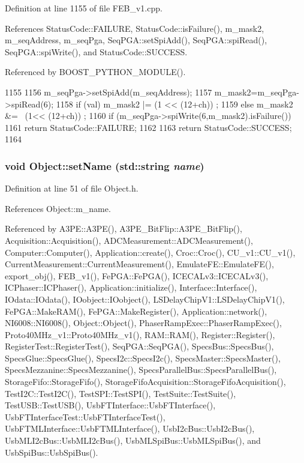 Definition at line 1155 of file FEB\_\-v1.cpp.

References StatusCode::FAILURE, StatusCode::isFailure(), m\_\-mask2, m\_\-seqAddress, m\_\-seqPga, SeqPGA::setSpiAdd(), SeqPGA::spiRead(), SeqPGA::spiWrite(), and StatusCode::SUCCESS.

Referenced by BOOST\_\-PYTHON\_\-MODULE().


\begin{DoxyCode}
1155                                                  {
1156   m_seqPga->setSpiAdd(m_seqAddress);
1157   m_mask2=m_seqPga->spiRead(6);
1158   if (val)  m_mask2 |= (1 << (12+ch))  ;
1159   else      m_mask2 &= ~(1<< (12+ch)) ;
1160   if (m_seqPga->spiWrite(6,m_mask2).isFailure()){
1161     return StatusCode::FAILURE;
1162   }
1163   return StatusCode::SUCCESS;  
1164 }
\end{DoxyCode}
\hypertarget{classObject_ae30fea75683c2d149b6b6d17c09ecd0c}{
\subsubsection[{setName}]{\setlength{\rightskip}{0pt plus 5cm}void Object::setName (std::string {\em name})}}
\label{classObject_ae30fea75683c2d149b6b6d17c09ecd0c}


Definition at line 51 of file Object.h.

References Object::m\_\-name.

Referenced by A3PE::A3PE(), A3PE\_\-BitFlip::A3PE\_\-BitFlip(), Acquisition::Acquisition(), ADCMeasurement::ADCMeasurement(), Computer::Computer(), Application::create(), Croc::Croc(), CU\_\-v1::CU\_\-v1(), CurrentMeasurement::CurrentMeasurement(), EmulateFE::EmulateFE(), export\_\-obj(), FEB\_\-v1(), FePGA::FePGA(), ICECALv3::ICECALv3(), ICPhaser::ICPhaser(), Application::initialize(), Interface::Interface(), IOdata::IOdata(), IOobject::IOobject(), LSDelayChipV1::LSDelayChipV1(), FePGA::MakeRAM(), FePGA::MakeRegister(), Application::network(), NI6008::NI6008(), Object::Object(), PhaserRampExec::PhaserRampExec(), Proto40MHz\_\-v1::Proto40MHz\_\-v1(), RAM::RAM(), Register::Register(), RegisterTest::RegisterTest(), SeqPGA::SeqPGA(), SpecsBus::SpecsBus(), SpecsGlue::SpecsGlue(), SpecsI2c::SpecsI2c(), SpecsMaster::SpecsMaster(), SpecsMezzanine::SpecsMezzanine(), SpecsParallelBus::SpecsParallelBus(), StorageFifo::StorageFifo(), StorageFifoAcquisition::StorageFifoAcquisition(), TestI2C::TestI2C(), TestSPI::TestSPI(), TestSuite::TestSuite(), TestUSB::TestUSB(), UsbFTInterface::UsbFTInterface(), UsbFTInterfaceTest::UsbFTInterfaceTest(), UsbFTMLInterface::UsbFTMLInterface(), UsbI2cBus::UsbI2cBus(), UsbMLI2cBus::UsbMLI2cBus(), UsbMLSpiBus::UsbMLSpiBus(), and UsbSpiBus::UsbSpiBus().


